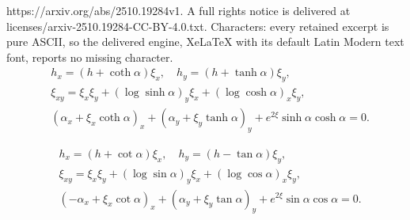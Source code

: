 \documentclass[10pt,a4paper]{amsart}
\begin{document}
https://arxiv.org/abs/2510.19284v1. A full rights notice is delivered at licenses/arxiv-2510.19284-CC-BY-4.0.txt. Characters: every retained excerpt is pure ASCII, so the delivered engine, XeLaTeX with its default Latin Modern text font, reports no missing character.
\begin{equation}
\label{eq:1st_govern}
\begin{aligned}
&h_x = (h + \coth \alpha) \xi_x, \quad 
h_y = (h + \tanh \alpha) \xi_y,\\
&\xi_{xy} = \xi_x \xi_y + (\log \sinh \alpha)_y \xi_x + (\log \cosh \alpha)_x \xi_y,\\
&(\alpha_x + \xi_x \coth \alpha)_x 
+ (\alpha_y + \xi_y \tanh \alpha)_y
+ e^{2\xi} \sinh \alpha \cosh \alpha = 0.
\end{aligned}
\end{equation}

\begin{equation}
\label{eq:2nd_govern}
\begin{aligned}
&h_x = (h + \cot \alpha) \xi_x, \quad
h_y = (h - \tan \alpha) \xi_y,\\
&\xi_{xy} = \xi_x \xi_y + (\log \sin \alpha)_y \xi_x + (\log \cos \alpha)_x \xi_y,\\
&(-\alpha_x + \xi_x \cot \alpha)_x + (\alpha_y + \xi_y \tan \alpha)_y + e^{2\xi} \sin \alpha \cos \alpha = 0.
\end{aligned}
\end{equation}
\end{document}
